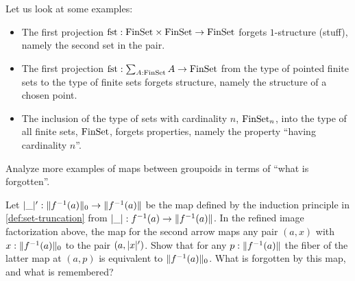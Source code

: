 \begin{example}\label{exa:stuff-struct-prop}
  Let us look at some examples:
  \begin{itemize}
  \item The first projection $\fst : \FinSet \times \FinSet \to \FinSet$
    forgets $1$-structure (stuff), namely the second set in the pair.
  \item The first projection $\fst : \sum_{A:\FinSet} A \to \FinSet$
    from the type of pointed finite sets to the type of finite sets
    forgets structure, namely the structure of a chosen point.
  \item The inclusion of the type of sets with cardinality
    $n$, $\mathrm{FinSet}_n$, into the type of all finite sets, $\mathrm{FinSet}$,
    forgets properties, namely the property
    ``having cardinality $n$''.\qedhere
    \end{itemize}
\end{example}
\begin{xca}\label{xca:stuff-struct-prop}
  Analyze more examples of maps between groupoids
  in terms of ``what is forgotten''.
\end{xca}
\begin{xca}\label{xca:0Im-to-Im}
  Let $\lvert\_\rvert' : \lVert f^{-1}(a)\rVert_0 \to \lVert f^{-1}(a)\rVert$ be the
  map defined by the induction principle in \cref{def:set-truncation}
  from $\lvert\_\rvert : f^{-1}(a) \to \lVert f^{-1}(a)\rVert$.
  In the refined image factorization above, the map for the second arrow
  maps any pair $(a,x)$ with $x:\lVert f^{-1}(a)\rVert_0$ to the pair $(a,\lvert x\rvert')$.
  Show that for any $p:\lVert f^{-1}(a)\rVert$ the fiber of the latter map at $(a,p)$
  is equivalent to $\lVert f^{-1}(a)\rVert_0$. What is forgotten by this map,
  and what is remembered?
\end{xca}

